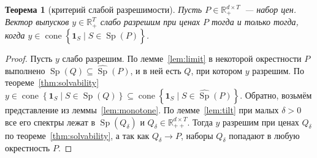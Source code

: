 \documentclass[a4paper,11pt]{article}
\theoremstyle{plain}
\newtheorem{theorem}{Теорема}[section]
\theoremstyle{definition}
\theoremstyle{remark}
\newcommand{\R}{\mathbb{R}}
\newcommand{\set}[1]{\left\{ #1 \right\}}
\newcommand{\Rpp}[1][2]{\R^{#1}_{++}} %
\newcommand{\Rp}[1][2]{\R^{#1}_{+}}   %
\DeclareMathOperator{\cone}{cone}
\DeclareMathOperator{\Sp}{Sp}
\begin{document}
\begin{theorem}[критерий слабой разрешимости]\label{thm:closure}
    Пусть $P\in\Rp[d\times T]$~--- набор цен. Вектор выпусков $y\in\Rp[T]$ слабо разрешим при ценах $P$ тогда и только тогда, когда $y\in\cone\set{\mathbf 1_S\mid S\in\widehat{\Sp}(P)}$.
\end{theorem}

\begin{proof}
    Пусть $y$ слабо разрешим. По лемме~\ref{lem:limit} в некоторой окрестности $P$ выполнено $\Sp(Q)\subseteq\widehat{\Sp}(P)$, и в ней есть $Q$, при котором $y$ разрешим. По теореме~\ref{thm:solvability} $y\in\cone\set{\mathbf 1_S\mid S\in\Sp(Q)}\subseteq\cone\set{\mathbf 1_S\mid S\in\widehat{\Sp}(P)}$.
    Обратно, возьмём представление из леммы~\ref{lem:monotone}. По лемме~\ref{lem:tilt} при малых $\delta>0$ все его спектры лежат в $\Sp(Q_\delta)$ и $Q_\delta\in\Rpp[d\times T]$. Тогда $y$ разрешим при ценах $Q_\delta$ по теореме~\ref{thm:solvability}, а так как $Q_\delta\to P$, наборы $Q_\delta$ попадают в любую окрестность $P$.
\end{proof}
\end{document}

